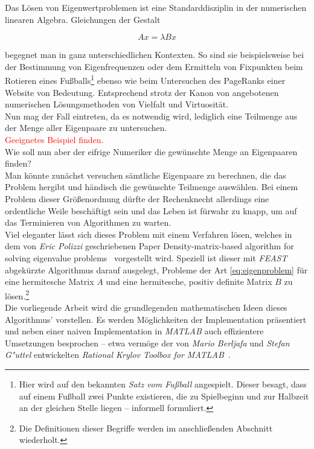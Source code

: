 Das Lösen von Eigenwertproblemen ist eine Standarddisziplin in der
numerischen linearen Algebra. Gleichungen der Gestalt

\begin{equation}\label{eq:eigenproblem}
Ax = \lambda Bx
\end{equation}

begegnet man in ganz unterschiedlichen Kontexten. So sind sie beispielsweise
bei der Bestimmung von Eigenfrequenzen oder dem Ermitteln von Fixpunkten beim
Rotieren eines Fußballs\footnote{Hier wird auf den bekannten
\emph{Satz vom Fußball} angespielt. Dieser besagt, dass auf einem Fußball
zwei Punkte existieren, die zu Spielbeginn und zur Halbzeit
an der gleichen Stelle liegen -- informell formuliert.} ebenso wie beim
Untersuchen des PageRanks einer Website von
Bedeutung. Entsprechend strotz der Kanon von angebotenen numerischen
Lösungsmethoden von Vielfalt und Virtuosität.\\

Nun mag der Fall eintreten, da es notwendig wird, lediglich eine Teilmenge
aus der Menge aller Eigenpaare zu untersuchen.\\
\textcolor{red}{Geeignetes Beispiel finden.}\\

Wie soll nun aber der eifrige Numeriker die gewünschte Menge an Eigenpaaren
finden?\\

Man könnte zunächst versuchen sämtliche Eigenpaare zu berechnen, die das Problem
hergibt und händisch die gewünschte Teilmenge auswählen. Bei einem Problem
dieser Größenordnung dürfte der Rechenknecht allerdings eine ordentliche Weile
beschäftigt sein und das Leben ist fürwahr zu knapp, um auf das Terminieren
von Algorithmen zu warten.\\

Viel eleganter lässt sich dieses Problem mit einem Verfahren lösen, welches in
dem von \emph{Eric Polizzi} geschriebenen Paper \glqq Density-matrix-based
algorithm for solving eigenvalue problems\grqq\ \cite{polizzi} vorgestellt wird.
Speziell ist dieser mit \emph{FEAST} abgekürzte Algorithmus darauf ausgelegt,
Probleme der Art \eqref{eq:eigenproblem} für eine hermitesche Matrix $A$ und
eine hermitesche, positiv definite Matrix $B$ zu lösen.\footnote{Die Definitionen
dieser Begriffe werden im anschließenden Abschnitt wiederholt.}\\

Die vorliegende Arbeit wird die grundlegenden mathematischen Ideen dieses Algorithmus'
vorstellen. Es werden Möglichkeiten der Implementation präsentiert und neben
einer naiven Implementation in \emph{MATLAB} auch effizientere Umsetzungen
besprochen -- etwa vermöge der von \emph{Mario Berljafa} und \emph{Stefan G"uttel}
entwickelten \glqq\emph{Rational Krylov Toolbox for MATLAB}\grqq\ \cite{rkt}.



